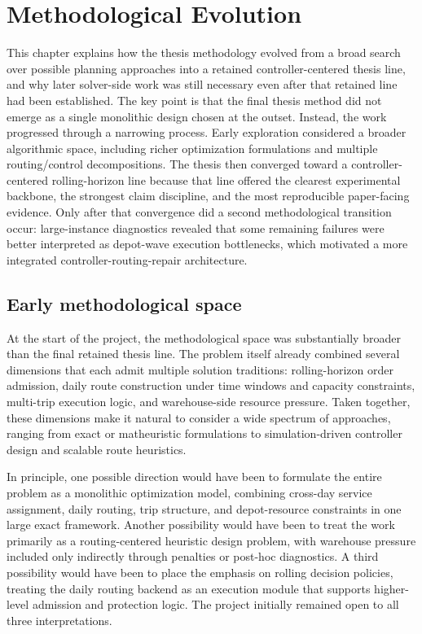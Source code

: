 \chapter{Methodological Evolution}
\label{chap:methodological_evolution}

This chapter explains how the thesis methodology evolved from a broad search over possible planning approaches into a retained controller-centered thesis line, and why later solver-side work was still necessary even after that retained line had been established. The key point is that the final thesis method did not emerge as a single monolithic design chosen at the outset. Instead, the work progressed through a narrowing process. Early exploration considered a broader algorithmic space, including richer optimization formulations and multiple routing/control decompositions. The thesis then converged toward a controller-centered rolling-horizon line because that line offered the clearest experimental backbone, the strongest claim discipline, and the most reproducible paper-facing evidence. Only after that convergence did a second methodological transition occur: large-instance diagnostics revealed that some remaining failures were better interpreted as depot-wave execution bottlenecks, which motivated a more integrated controller-routing-repair architecture.

\section{Early methodological space}

At the start of the project, the methodological space was substantially broader than the final retained thesis line. The problem itself already combined several dimensions that each admit multiple solution traditions: rolling-horizon order admission, daily route construction under time windows and capacity constraints, multi-trip execution logic, and warehouse-side resource pressure. Taken together, these dimensions make it natural to consider a wide spectrum of approaches, ranging from exact or matheuristic formulations to simulation-driven controller design and scalable route heuristics.

In principle, one possible direction would have been to formulate the entire problem as a monolithic optimization model, combining cross-day service assignment, daily routing, trip structure, and depot-resource constraints in one large exact framework. Another possibility would have been to treat the work primarily as a routing-centered heuristic design problem, with warehouse pressure included only indirectly through penalties or post-hoc diagnostics. A third possibility would have been to place the emphasis on rolling decision policies, treating the daily routing backend as an execution module that supports higher-level admission and protection logic. The project initially remained open to all three interpretations.

